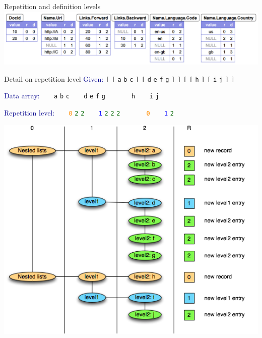 \documentclass{beamer}
\begin{document}
\begin{frame}{Repetition and definition levels}
\vspace{0.5 cm}
\includegraphics[width=\linewidth]{repetition_and_definition_arrays.png}
\end{frame}

\begin{frame}{Detail on repetition level}
\vspace{0.3 cm}
\textcolor{darkblue}{Given:} \hfill {\tt [} {\tt [} {\tt a} {\tt b} {\tt c} {\tt ]} {\tt [} {\tt d} {\tt e} {\tt f} {\tt g} {\tt ]} {\tt ]} {\tt [} {\tt [} {\tt h} {\tt ]} {\tt [} {\tt i} {\tt j} {\tt ]} {\tt ]}

\textcolor{darkblue}{Data array:} \hfill {\tt \ } {\tt \ } {\tt a} {\tt b} {\tt c} {\tt \ } {\tt \ } {\tt d} {\tt e} {\tt f} {\tt g} {\tt \ } {\tt \ } {\tt \ } {\tt \ } {\tt h} {\tt \ } {\tt \ } {\tt i} {\tt j} {\tt \ } {\tt \ }

\textcolor{darkblue}{Repetition level:} \hfill {\tt \ } {\tt \ } \textcolor{darkorange}{\tt 0} \textcolor{darkgreen}{\tt 2} \textcolor{darkgreen}{\tt 2} {\tt \ } {\tt \ } \textcolor{blue}{\tt 1} \textcolor{darkgreen}{\tt 2} \textcolor{darkgreen}{\tt 2} \textcolor{darkgreen}{\tt 2} {\tt \ } {\tt \ } {\tt \ } {\tt \ } \textcolor{darkorange}{\tt 0} {\tt \ } {\tt \ } \textcolor{blue}{\tt 1} \textcolor{darkgreen}{\tt 2} {\tt \ } {\tt \ }

\begin{center}
\includegraphics[width=0.73\linewidth]{repetition_and_definition_3.png}
\end{center}
\end{frame}
\end{document}
